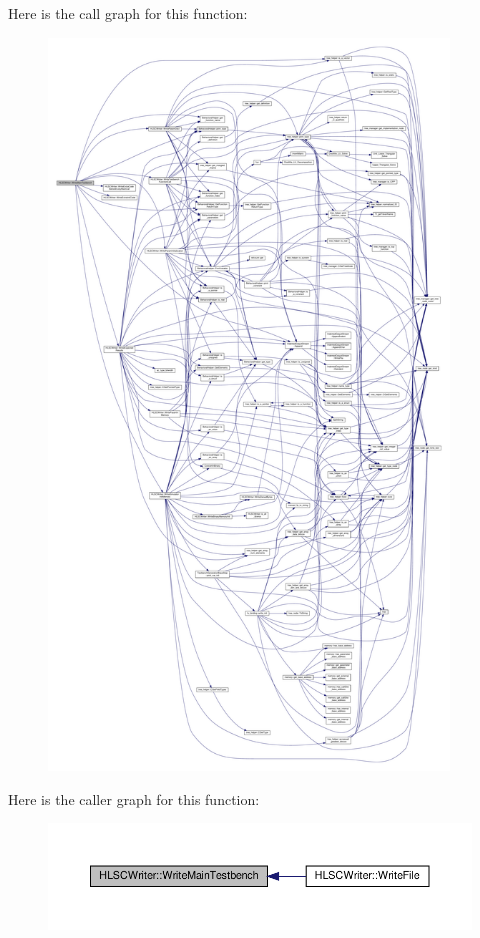 Here is the call graph for this function\+:
\nopagebreak
\begin{figure}[H]
\begin{center}
\leavevmode
\includegraphics[height=550pt]{d4/db1/classHLSCWriter_a169bdc6b181d083f9e4eb033f2da65da_cgraph}
\end{center}
\end{figure}
Here is the caller graph for this function\+:
\nopagebreak
\begin{figure}[H]
\begin{center}
\leavevmode
\includegraphics[width=350pt]{d4/db1/classHLSCWriter_a169bdc6b181d083f9e4eb033f2da65da_icgraph}
\end{center}
\end{figure}
\mbox{\label{classHLSCWriter_a7b7f749a967e9b84acd3488413a31c02}} 
